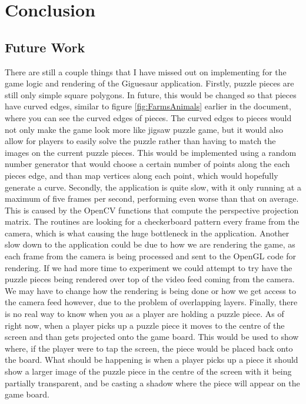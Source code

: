 \documentclass{article}
\begin{document}

\section{Conclusion}

\subsection{Future Work}
There are still a couple things that I have missed out on implementing for the
game logic and rendering of the Giguesaur application. Firstly, puzzle pieces
are still only simple square polygons. In future, this would be changed so that
pieces have curved edges, similar to figure \ref{fig:FarmsAnimals} earlier in
the document, where you can see the curved edges of pieces. The curved edges to
pieces would not only make the game look more like jigsaw puzzle game, but it
would also allow for players to easily solve the puzzle rather than having to
match the images on the current puzzle pieces. This would be implemented using a
random number generator that would choose a certain number of points along the
each pieces edge, and than map vertices along each point, which would hopefully
generate a curve. Secondly, the application is quite slow, with it only running
at a maximum of five frames per second, performing even worse than that on
average. This is caused by the OpenCV functions that compute the perspective
projection matrix. The routines are looking for a checkerboard pattern every
frame from the camera, which is what causing the huge bottleneck in the
application. Another slow down to the application could be due to how we are
rendering the game, as each frame from the camera is being processed and sent to
the OpenGL code for rendering. If we had more time to experiment we could
attempt to try have the puzzle pieces being rendered over top of the video feed
coming from the camera. We may have to change how the rendering is being done or
how we get access to the camera feed however, due to the problem of overlapping
layers. Finally, there is no real way to know when you as a player are holding a
puzzle piece. As of right now, when a player picks up a puzzle piece it moves to
the centre of the screen and than gets projected onto the game board. This would
be used to show where, if the player were to tap the screen, the piece would be
placed back onto the board. What should be happening is when a player picks up a
piece it should show a larger image of the puzzle piece in the centre of the
screen with it being partially transparent, and be casting a shadow where the
piece will appear on the game board. 
\end{document}
